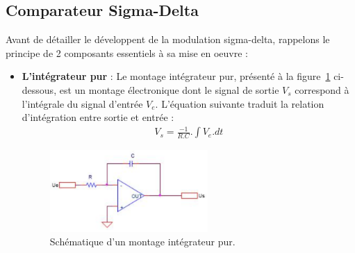 \documentclass[10pt, oneside, a4paper]{article}
\begin{document}
\subsection{Comparateur Sigma-Delta}
Avant de détailler le développent de la modulation sigma-delta, rappelons le principe de 2 composants essentiels à sa mise en oeuvre : 
\begin{itemize}
\item \noindent\textbf{L'intégrateur pur} : Le montage intégrateur pur, présenté à la figure~\ref{fig:IntegPur} ci-dessous, est un montage électronique dont le signal de sortie $V_{s}$ correspond à l'intégrale du signal d'entrée $V_{e}$. L'équation suivante traduit la relation d'intégration entre sortie et entrée : 
\begin{gather}
    V_{s} = \frac{-1}{R.C}.\int V_{e}.dt 
\end{gather}
\begin{figure}[!ht]
	\centering
	\includegraphics[width=6cm]{image/integrateur.png}
	\caption{Schématique d'un montage intégrateur pur.}
	\label{fig:IntegPur}
\end{figure}


\end{itemize}
\end{document}
